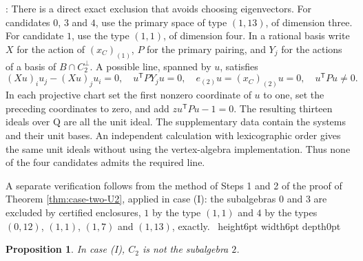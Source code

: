 \documentclass[leqno]{article}
\newcommand{\Q}{\mathrm{Q}}
\newcommand{\qed}{\hfill \vrule height6pt  width6pt depth0pt}
\newtheorem{prop}[thm]{Proposition}
\newenvironment{proof}[1][]{\noindent {\it Proof #1} : }{\hbox{~}\qed
\smallskip
}
\numberwithin{equation}{section}
\begin{document}
\begin{proof}
There is a direct exact exclusion that avoids choosing eigenvectors. For candidates $0$, $3$ and $4$, use the primary space of type $(1,13)$, of dimension three. For candidate $1$, use the type $(1,1)$, of dimension four. In a rational basis write $X$ for the action of $(x_C)_{(1)}$, $P$ for the primary pairing, and $Y_j$ for the actions of a basis of $B \cap C_2^\perp$. A possible line, spanned by $u$, satisfies
\[
(Xu)_i u_j-(Xu)_j u_i = 0, \quad u^{\mathsf T}P Y_j u = 0,
\quad e_{(2)}u = (x_C)_{(2)}u = 0, \quad u^{\mathsf T}Pu \neq 0.
\]
In each projective chart set the first nonzero coordinate of $u$ to one, set the preceding coordinates to zero, and add $z u^{\mathsf T}Pu-1 = 0$. The resulting thirteen ideals over $\Q$ are all the unit ideal. The supplementary data contain the systems and their unit bases. An independent calculation with lexicographic order gives the same unit ideals without using the vertex-algebra implementation. Thus none of the four candidates admits the required line.

A separate verification follows from the method of Steps 1 and 2 of the proof of Theorem \ref{thm:case-two-U2}, applied in case (I): the subalgebras $0$ and $3$ are excluded by certified enclosures, $1$ by the type $(1,1)$ and $4$ by the types $(0,12)$, $(1,1)$, $(1,7)$ and $(1,13)$, exactly.
\end{proof}

\begin{prop}
\label{prop:case-one-two}
In case (I), $C_2$ is not the subalgebra $2$.
\end{prop}
\end{document}
